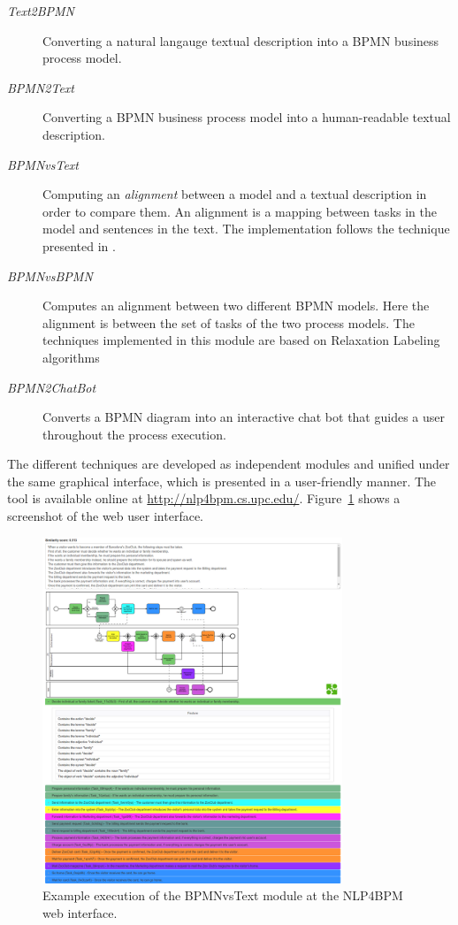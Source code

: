 \begin{description}
\item[\emph{Text2BPMN}]{Converting a natural langauge textual description into a
  BPMN business process model.}  
\item[\emph{BPMN2Text}]{Converting a BPMN business process model into a
    human-readable textual description.}  
\item[\emph{BPMNvsText}]{Computing an \emph{alignment} between a model and a
    textual description in order to compare them. An alignment is a mapping
    between tasks in the model and sentences in the text. The implementation
    follows the technique presented in \cite{10.1007/978-3-319-59536-8_26}.}  
\item[\emph{BPMNvsBPMN}]{Computes an alignment between two different BPMN
    models. Here the alignment is between the set of tasks of the two process
    models. The techniques implemented in this module are based on Relaxation
    Labeling algorithms}  
\item[\emph{BPMN2ChatBot}]{Converts a BPMN diagram into an interactive chat bot
    that guides a user throughout the process execution.}
\end{description}

The different techniques are developed as independent modules and unified under
the same graphical interface, which is presented in a user-friendly manner. The
tool is available online at \url{http://nlp4bpm.cs.upc.edu/}.
Figure~\ref{fig:nlp4bpm_example} shows a screenshot of the web user interface.

\begin{figure}[htb]
  \centering
  \includegraphics[width=0.8\textwidth]{figures/nlp4bpm}
  \caption{Example execution of the BPMNvsText module at the NLP4BPM web
    interface.}
  \label{fig:nlp4bpm_example}
\end{figure}

